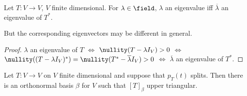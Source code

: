 \begin{corollary}\label{cor:eigenvaluesofadjoint}
    Let $T : V \to V$, $V$ finite dimensional. For $\lambda \in \field$, $\lambda$ an eigenvalue iff $\overline{\lambda}$ an eigenvalue of $T^\ast$.
\end{corollary}

\begin{remark}
    But the corresponding eigenvectors may be different in general.
\end{remark}

\begin{proof}
    $\lambda$ an eigenvalue of $T$ $\iff$ $\nullity(T - \lambda I_V) > 0$ $\iff$ $\nullity((T - \lambda I_V)^\ast) = \nullity(T^\ast - \overline{\lambda} I_V) > 0$ $\iff$ $\overline{\lambda}$ an eigenvalue of $T^\ast$.
\end{proof}

\begin{lemma}
    Let $T : V \to V$ on $V$ finite dimensional and suppose that $p_T(t)$ splits. Then there is an orthonormal basis $\beta$ for $V$ such that $[T]_\beta$ upper triangular.
\end{lemma}

